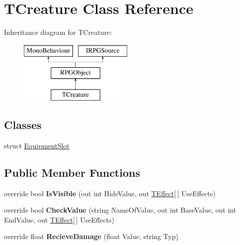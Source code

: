 \hypertarget{class_t_creature}{}\section{T\+Creature Class Reference}
\label{class_t_creature}
Inheritance diagram for T\+Creature\+:\begin{figure}[H]
\begin{center}
\leavevmode
\includegraphics[height=3.000000cm]{class_t_creature}
\end{center}
\end{figure}
\subsection*{Classes}
\begin{DoxyCompactItemize}
\item 
struct \hyperlink{struct_t_creature_1_1_equipment_slot}{Equipment\+Slot}
\end{DoxyCompactItemize}
\subsection*{Public Member Functions}
\begin{DoxyCompactItemize}
\item 
\hypertarget{class_t_creature_ab49e4ba9805e8ea34ed2992f5b9eb507}{}override bool {\bfseries Is\+Visible} (out int Hide\+Value, out \hyperlink{class_t_effect}{T\+Effect}\mbox{[}$\,$\mbox{]} Use\+Effects)\label{class_t_creature_ab49e4ba9805e8ea34ed2992f5b9eb507}

\item 
\hypertarget{class_t_creature_a721027f6e2ddb18cc24617da081d609b}{}override bool {\bfseries Check\+Value} (string Name\+Of\+Value, out int Base\+Value, out int End\+Value, out \hyperlink{class_t_effect}{T\+Effect}\mbox{[}$\,$\mbox{]} Use\+Effects)\label{class_t_creature_a721027f6e2ddb18cc24617da081d609b}

\item 
\hypertarget{class_t_creature_a875491187fd013158f76ac0f11de9506}{}override float {\bfseries Recieve\+Damage} (float Value, string Typ)\label{class_t_creature_a875491187fd013158f76ac0f11de9506}

\end{DoxyCompactItemize}
